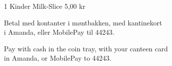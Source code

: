 \documentclass{article}
\begin{document}
1 Kinder Milk-Slice
\hfill 5,00 kr
% 
% 
% 
% 
% 
% 
% 
% 
% 
% 
% 
% 
% 
% 
% 
% 

\vspace{0.5cm}

\begin{center}
\Large\bf

Betal med kontanter i møntbakken, med kantinekort \\ i Amanda, eller MobilePay
til 44243.

{\english Pay with cash in the coin tray, with your canteen card \\ in Amanda,
or MobilePay to 44243.}

\end{center}

\underskriv
\end{document}
